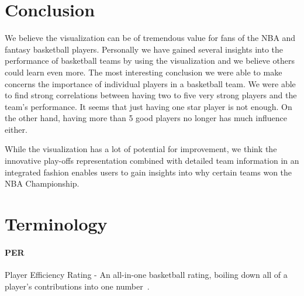 \documentclass[]{sigchi}
\begin{document}
\section{Conclusion}\label{sec:conclusion}
We believe the visualization can be of tremendous value for fans of the NBA 
and fantasy basketball players. Personally we have gained several insights into
the performance of basketball teams by using the visualization and we believe
others could learn even more. 
The most interesting conclusion we were able to make concerns the importance of
individual players in a basketball team. We were able to find strong
correlations between having two to five very strong players and the team's
performance. It seems that just having one star player is not enough. On the other hand, having more than 5 good players no longer has much influence either. 

While the visualization has a lot of potential for improvement, we think the
innovative play-offs representation combined with detailed team information in
an integrated fashion enables users to gain insights into why certain teams won the NBA Championship.

%
%
%
%
%
\balance{}

%

\printbibliography

\appendix
\section{Terminology}\label{sec:terminology}

\paragraph{PER} Player Efficiency Rating - An all-in-one basketball rating,
boiling down all of a player's contributions into one number~\cite{per}.
\end{document}
